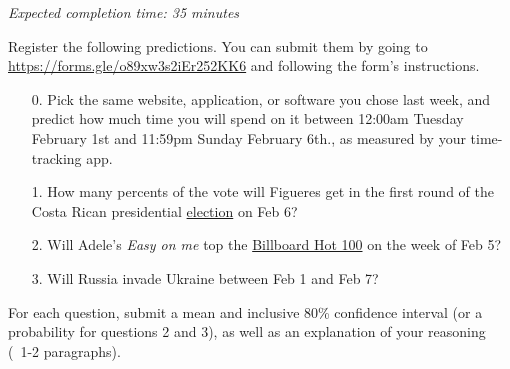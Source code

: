 \documentclass[11pt]{article}
\begin{document}
\emph{Expected completion time: 35 minutes}

Register the following predictions. You can submit them by going to \url{https://forms.gle/o89xw3s2iEr252KK6} and following the form's instructions.

\begin{enumerate}
	\item[0.] Pick the same website, application, or software you chose last week, and predict how much time you will spend on it between 12:00am Tuesday February 1st and 11:59pm Sunday February 6th., as measured by your time-tracking app.
	
	\item[1.] How many percents of the vote will Figueres get in the first round of the Costa Rican presidential \href{https://en.wikipedia.org/wiki/2022_Costa_Rican_general_election}{election} on Feb 6?
	
	\item[2.] Will Adele's \textit{Easy on me} top the \href{https://www.billboard.com/charts/hot-100/}{Billboard Hot 100} on the week of Feb 5?
 
	\item[3.] Will Russia invade Ukraine between Feb 1 and Feb 7?
	
	
\end{enumerate}

For each question, submit a mean and inclusive 80\% confidence interval (or a probability for questions 2 and 3), as well as an explanation of your reasoning (~1-2 paragraphs).
\end{document}
